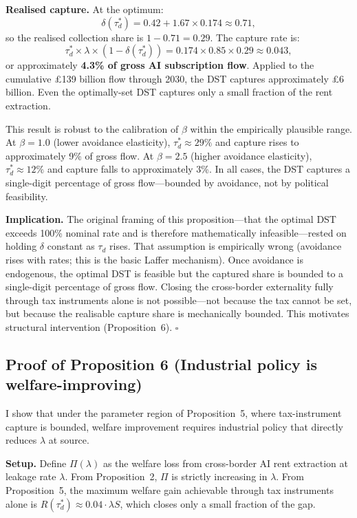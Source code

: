\documentclass[11pt,letterpaper]{article}
\theoremstyle{remark}
\begin{document}
\textbf{Realised capture.} At the optimum:
\[
\delta(\tau_d^*) = 0.42 + 1.67 \times 0.174 \approx 0.71,
\]
so the realised collection share is $1 - 0.71 = 0.29$. The capture rate is:
\[
\tau_d^* \times \lambda \times (1 - \delta(\tau_d^*)) = 0.174 \times 0.85 \times 0.29 \approx 0.043,
\]
or approximately \textbf{4.3\% of gross AI subscription flow}. Applied to the cumulative \pounds139 billion flow through 2030, the DST captures approximately \pounds6 billion. Even the optimally-set DST captures only a small fraction of the rent extraction.

This result is robust to the calibration of $\beta$ within the empirically plausible range. At $\beta = 1.0$ (lower avoidance elasticity), $\tau_d^* \approx 29\%$ and capture rises to approximately 9\% of gross flow. At $\beta = 2.5$ (higher avoidance elasticity), $\tau_d^* \approx 12\%$ and capture falls to approximately 3\%. In all cases, the DST captures a single-digit percentage of gross flow---bounded by avoidance, not by political feasibility.

\textbf{Implication.} The original framing of this proposition---that the optimal DST exceeds 100\% nominal rate and is therefore mathematically infeasible---rested on holding $\delta$ constant as $\tau_d$ rises. That assumption is empirically wrong (avoidance rises with rates; this is the basic Laffer mechanism). Once avoidance is endogenous, the optimal DST is feasible but the captured share is bounded to a single-digit percentage of gross flow. Closing the cross-border externality fully through tax instruments alone is not possible---not because the tax cannot be set, but because the realisable capture share is mechanically bounded. This motivates structural intervention (Proposition~6). \hfill$\square$

\subsection*{Proof of Proposition 6 (Industrial policy is welfare-improving)}

I show that under the parameter region of Proposition~5, where tax-instrument capture is bounded, welfare improvement requires industrial policy that directly reduces $\lambda$ at source.

\textbf{Setup.} Define $\Pi(\lambda)$ as the welfare loss from cross-border AI rent extraction at leakage rate $\lambda$. From Proposition~2, $\Pi$ is strictly increasing in $\lambda$. From Proposition~5, the maximum welfare gain achievable through tax instruments alone is $R(\tau_d^*) \approx 0.04 \cdot \lambda S$, which closes only a small fraction of the gap.
\end{document}
